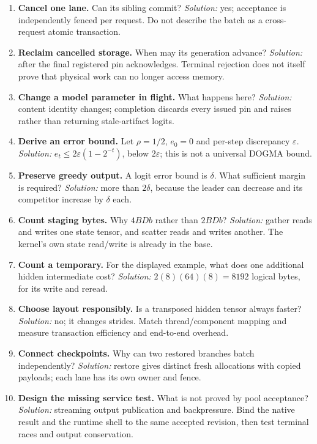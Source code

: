 \begin{enumerate}
lanes? \emph{Solution:} no; complete group validation and arithmetic precede
pin acquisition in this serialized reference.
\item \textbf{Cancel one lane.} Can its sibling commit?
\emph{Solution:} yes; acceptance is independently fenced per request.
Do not describe the batch as a cross-request atomic transaction.
\item \textbf{Reclaim cancelled storage.} When may its generation advance?
\emph{Solution:} after the final registered pin acknowledges. Terminal
rejection does not itself prove that physical work can no longer access memory.
\item \textbf{Change a model parameter in flight.} What happens here?
\emph{Solution:} content identity changes; completion discards every issued
pin and raises rather than returning stale-artifact logits.
\item \textbf{Derive an error bound.} Let $\rho=1/2$, $e_0=0$ and per-step
discrepancy $\varepsilon$. \emph{Solution:} $e_t\le2\varepsilon(1-2^{-t})$,
below $2\varepsilon$; this is not a universal DOGMA bound.
\item \textbf{Preserve greedy output.} A logit error bound is $\delta$.
What sufficient margin is required? \emph{Solution:} more than $2\delta$,
because the leader can decrease and its competitor increase by $\delta$ each.
\item \textbf{Count staging bytes.} Why $4BDb$ rather than $2BDb$?
\emph{Solution:} gather reads and writes one state tensor, and scatter reads
and writes another. The kernel's own state read/write is already in the base.
\item \textbf{Count a temporary.} For the displayed example, what does one
additional hidden intermediate cost? \emph{Solution:} $2(8)(64)(8)=8192$
logical bytes, for its write and reread.
\item \textbf{Choose layout responsibly.} Is a transposed hidden tensor always
faster? \emph{Solution:} no; it changes strides. Match thread/component mapping
and measure transaction efficiency and end-to-end overhead.
\item \textbf{Connect checkpoints.} Why can two restored branches batch
independently? \emph{Solution:} restore gives distinct fresh allocations with
copied payloads; each lane has its own owner and fence.
\item \textbf{Design the missing service test.} What is not proved by pool
acceptance? \emph{Solution:} streaming output publication and backpressure.
Bind the native result and the runtime shell to the same accepted revision,
then test terminal races and output conservation.
\end{enumerate}

